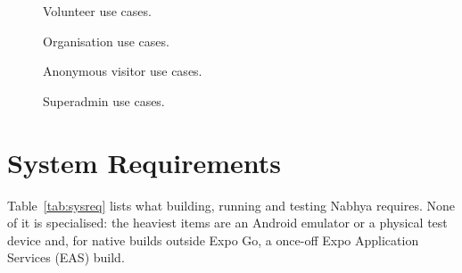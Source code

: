 \clearpage
\begin{figure}[H]
    \centering
    \caption{Volunteer use cases.}
    \label{fig:use-case-volunteer}
\end{figure}

\clearpage
\begin{figure}[H]
    \centering
    \caption{Organisation use cases.}
    \label{fig:use-case-org}
\end{figure}

\clearpage
\begin{figure}[H]
    \centering
    \caption{Anonymous visitor use cases.}
    \label{fig:use-case-anon}
\end{figure}

\vspace{0.3in}
\begin{figure}[H]
    \centering
    \caption{Superadmin use cases.}
    \label{fig:use-case-admin}
\end{figure}

\section{System Requirements}
\label{sec:system-requirements}
Table~\ref{tab:sysreq} lists what building, running and testing Nabhya requires. None of it is specialised: the heaviest items are an Android emulator or a physical test device and, for native builds outside Expo Go, a once-off Expo Application Services (EAS) build.

